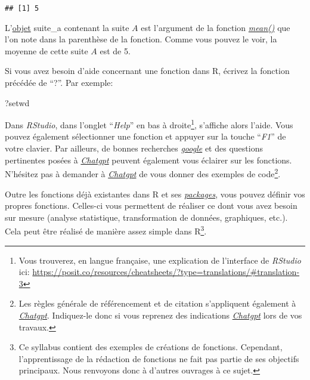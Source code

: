 \documentclass[
]{book}
\newenvironment{Shaded}{\begin{snugshade}}{\end{snugshade}}
\newcommand{\NormalTok}[1]{#1}
\begin{document}
\begin{verbatim}
## [1] 5
\end{verbatim}

L'\protect\hyperlink{objets_envir}{objet} suite\_a contenant la suite \(A\) est l'argument de la fonction \href{https://www.rdocumentation.org/packages/base/versions/3.6.2/topics/mean}{\emph{mean()}} que l'on note dans la parenthèse de la fonction. Comme vous pouvez le voir, la moyenne de cette suite \(A\) est de 5.

Si vous avez besoin d'aide concernant une fonction dans R, écrivez la fonction précédée de ``?''. Par exemple:

\begin{Shaded}
\begin{Highlighting}[]
\NormalTok{?setwd}
\end{Highlighting}
\end{Shaded}

Dans \emph{RStudio}, dans l'onglet ``\emph{Help}'' en bas à droite\footnote{Vous trouverez, en langue française, une explication de l'interface de \emph{RStudio} ici: \url{https://posit.co/resources/cheatsheets/?type=translations/\#translation-3}}, s'affiche alors l'aide. Vous pouvez également sélectionner une fonction et appuyer sur la touche ``\emph{F1}'' de votre clavier. Par ailleurs, de bonnes recherches \href{https://www.google.com/}{\emph{google}} et des questions pertinentes posées à \href{https://openai.com/blog/chatgpt/}{\emph{Chatgpt}} peuvent également vous éclairer sur les fonctions. N'hésitez pas à demander à \href{https://openai.com/blog/chatgpt/}{\emph{Chatgpt}} de vous donner des exemples de code\footnote{Les règles générale de référencement et de citation s'appliquent également à \href{https://openai.com/blog/chatgpt/}{\emph{Chatgpt}}. Indiquez-le donc si vous reprenez des indications \href{https://openai.com/blog/chatgpt/}{\emph{Chatgpt}} lors de vos travaux.}.

Outre les fonctions déjà existantes dans R et ses \protect\hyperlink{packages}{\emph{packages}}, vous pouvez définir vos propres fonctions. Celles-ci vous permettent de réaliser ce dont vous avez besoin sur mesure (analyse statistique, transformation de données, graphiques, etc.). Cela peut être réalisé de manière assez simple dans R\footnote{Ce syllabus contient des exemples de créations de fonctions. Cependant, l'apprentissage de la rédaction de fonctions ne fait pas partie de ses objectifs principaux. Nous renvoyons donc à d'autres ouvrages à ce sujet.}.
\end{document}
